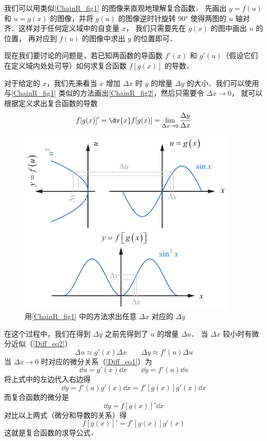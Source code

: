 我们可以用类似\autoref{ChainR_fig1} 的图像来直观地理解复合函数． 先画出 $y = f(u)$ 和 $u = g(x)$ 的图像，并将 $g(u)$ 的图像逆时针旋转 90° 使得两图的 $u$ 轴对齐．这样对于任何定义域中的自变量 $x$， 我们只需要先在 $g(x)$ 的图中画出 $u$ 的位置， 再对应到 $f(u)$ 的图像中求出 $y$ 的位置即可． 

现在我们要讨论的问题是，若已知两函数的导函数 $f'(x)$ 和 $g'(u)$（假设它们在定义域内处处可导）如何求复合函数 $f[g(x)]$ 的导数．

对于给定的 $x$，我们先来看当 $x$ 增加 $\Delta x$ 时 $y$ 的增量 $\Delta y$ 的大小．我们可以使用与\autoref{ChainR_fig1} 类似的方法画出\autoref{ChainR_fig2}，然后只需要令 $\Delta x \to 0$， 就可以根据定义求出复合函数的导数
\begin{equation}
f[g(x)]' = \dv{x} f[g(x)] = \lim_{\Delta x\to 0} \frac{\Delta y}{\Delta x}
\end{equation}

\begin{figure}[ht]
\centering
\includegraphics[width=10.5cm]{./figures/ChainR_2.pdf}
\caption{用\autoref{ChainR_fig1} 中的方法求出任意 $\Delta x$ 对应的 $\Delta y$} \label{ChainR_fig2}
\end{figure}

在这个过程中，我们在得到 $\Delta y$ 之前先得到了 $u$ 的增量 $\Delta u$． 当 $\Delta x$ 较小时有微分近似（\autoref{Diff_eq2}）
\begin{equation}
\Delta {u} \approx g'(x) \Delta{x}
\qquad
\Delta{y} \approx f'(u) \Delta{u}
\end{equation}
当 $\Delta x \to 0$ 时对应的微分关系（\autoref{Diff_eq1}）为
\begin{equation}
\dd{u} = g'(x) \dd{x}
\qquad
\dd{y} = f'(u) \dd{u}
\end{equation}
将上式中的左边代入右边得
\begin{equation}
\dd{y} = f'(u) g'(x) \dd{x} = f'[g(x)]g'(x) \dd{x}
\end{equation}
而复合函数的微分是
\begin{equation}
\dd{y} = f[g(x)]' \dd{x}
\end{equation}
对比以上两式（微分和导数的关系）得
\begin{equation}\label{ChainR_eq4}
f[g(x)]' = f'[g(x)]g'(x)
\end{equation}
这就是复合函数的求导公式．

